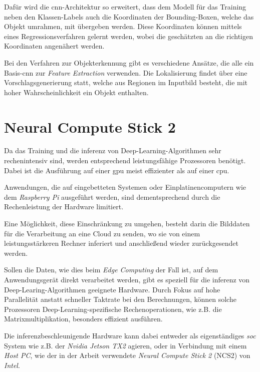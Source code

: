 Dafür wird die \Gls{cnn}-Architektur so erweitert,
dass dem Modell für das Training neben den Klassen-Labels
auch die Koordinaten der Bounding-Boxen,
welche das Objekt umrahmen, mit übergeben werden.
Diese Koordinaten können mittels eines Regressionsverfahren
gelernt werden, wobei die geschätzten an die richtigen 
Koordinaten angenähert werden.

Bei den Verfahren zur Objekterkennung gibt es 
verschiedene Ansätze, die alle ein Basis-\Gls{cnn}
zur \textit{Feature Extraction} verwenden.
Die Lokalisierung findet über eine 
Vorschlagsgenerierung statt, welche aus 
Regionen im Inputbild besteht, die 
mit hoher Wahrscheinlichkeit ein Objekt enthalten.


\section{Neural Compute Stick 2}\label{ncs2}


Da das Training und die \Gls{inferenz} von Deep-Learning-Algorithmen
sehr rechenintensiv sind, werden entsprechend leistungsfähige 
Prozessoren benötigt. Dabei ist die Ausführung auf einer
\Gls{gpu} meist effizienter als auf einer \Gls{cpu}.

Anwendungen, die auf eingebetteten Systemen oder 
Einplatinencomputern wie dem \textit{Raspberry Pi} 
ausgeführt werden,
sind dementsprechend durch die Rechenleistung der Hardware
limitiert.

Eine Möglichkeit, diese Einschränkung zu umgehen,
besteht darin die Bilddaten für die Verarbeitung
 an eine Cloud zu senden, wo sie 
von einem leistungsstärkeren Rechner inferiert und 
anschließend wieder zurückgesendet werden.

Sollen die Daten, wie dies beim \textit{Edge Computing}
 der Fall ist, 
auf dem Anwendungsgerät direkt verarbeitet werden,
gibt es speziell für die \Gls{inferenz} von Deep-Learing-Algorithmen
geeignete Hardware.
Durch Fokus auf hohe Parallelität anstatt schneller Taktrate
bei den Berechnungen, können solche Prozessoren
Deep-Learning-spezifische Rechenoperationen, 
wie z.B. die Matrixmultiplikation, besonders effizient 
ausführen.

Die inferenzbeschleunigende Hardware kann dabei entweder
als eigenständiges \textit{\Gls{soc}}
System wie z.B. der \textit{Nvidia Jetson TX2} agieren, oder
in Verbindung mit einem \textit{Host PC}, wie der in der Arbeit 
verwendete \textit{Neural Compute Stick 2} (NCS2) von
\textit{Intel}.

